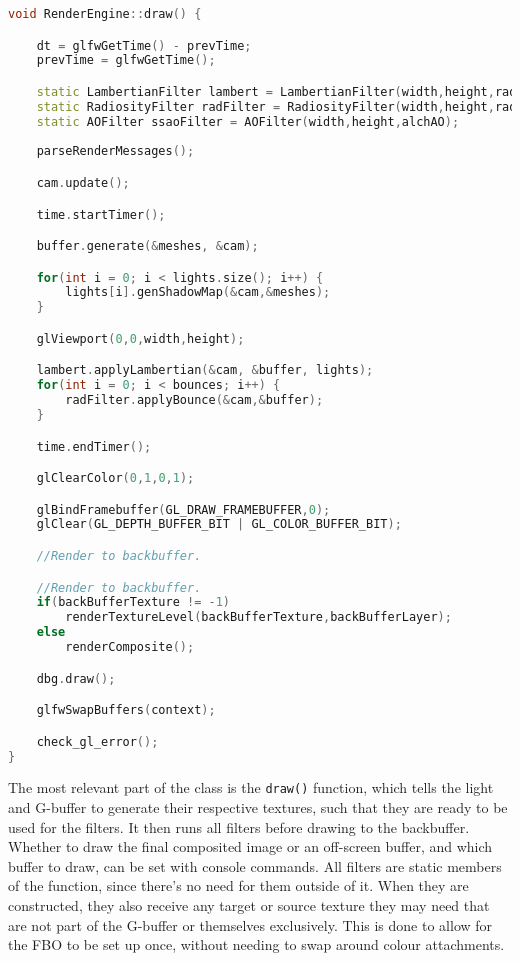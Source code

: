 \begin{lstlisting}[caption={RenderEngine.cpp},language=c++]
void RenderEngine::draw() {

    dt = glfwGetTime() - prevTime;
    prevTime = glfwGetTime();

    static LambertianFilter lambert = LambertianFilter(width,height,radPrev,radTot);
    static RadiosityFilter radFilter = RadiosityFilter(width,height,radPrev,radTot);
	static AOFilter ssaoFilter = AOFilter(width,height,alchAO);	
	
    parseRenderMessages();

    cam.update();

    time.startTimer();

    buffer.generate(&meshes, &cam);

    for(int i = 0; i < lights.size(); i++) {
        lights[i].genShadowMap(&cam,&meshes);
    }

    glViewport(0,0,width,height);

    lambert.applyLambertian(&cam, &buffer, lights);
    for(int i = 0; i < bounces; i++) {
        radFilter.applyBounce(&cam,&buffer);
    }

    time.endTimer();

    glClearColor(0,1,0,1);

    glBindFramebuffer(GL_DRAW_FRAMEBUFFER,0);
    glClear(GL_DEPTH_BUFFER_BIT | GL_COLOR_BUFFER_BIT);

    //Render to backbuffer.

    //Render to backbuffer.
	if(backBufferTexture != -1)
		renderTextureLevel(backBufferTexture,backBufferLayer);
	else
		renderComposite();

    dbg.draw();

    glfwSwapBuffers(context);

    check_gl_error();
}
\end{lstlisting}
The most relevant part of the class is the \verb=draw()= function, which tells the light and G-buffer to generate their respective textures, such that they are ready to be used for the filters. It then runs all filters before drawing to the backbuffer. Whether to draw the final composited image or an off-screen buffer, and which buffer to draw, can be set with console commands. All filters are static members of the function, since there's no need for them outside of it. When they are constructed, they also receive any target or source texture they may need that are not part of the G-buffer or themselves exclusively. This is done to allow for the FBO to be set up once, without needing to swap around colour attachments.

